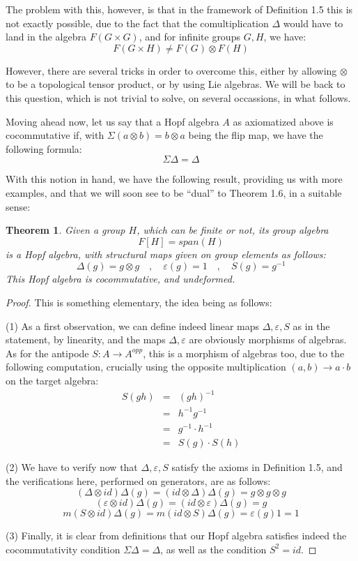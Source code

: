 \documentclass[12pt]{amsbook}
\newtheorem{theorem}{Theorem}[chapter]
\begin{document}
\bigskip

The problem with this, however, is that in the framework of Definition 1.5 this is not exactly possible, due to the fact that the comultiplication $\Delta$ would have to land in the algebra $F(G\times G)$, and for infinite groups $G,H$, we have:
$$F(G\times H)\neq F(G)\otimes F(H)$$

However, there are several tricks in order to overcome this, either by allowing $\otimes$ to be a topological tensor product, or by using Lie algebras. We will be back to this question, which is not trivial to solve, on several occassions, in what follows.

\bigskip

Moving ahead now, let us say that a Hopf algebra $A$ as axiomatized above is cocommutative if, with $\Sigma(a\otimes b)=b\otimes a$ being the flip map, we have the following formula:
$$\Sigma\Delta=\Delta$$

With this notion in hand, we have the following result, providing us with more examples, and that we will soon see to be ``dual'' to Theorem 1.6, in a suitable sense:


\begin{theorem}
Given a group $H$, which can be finite or not, its group algebra
$$F[H]=span(H)$$
is a Hopf algebra, with structural maps given on group elements as follows:
$$\Delta(g)=g\otimes g\quad,\quad
\varepsilon(g)=1\quad,\quad
S(g)=g^{-1}$$
This Hopf algebra is cocommutative, and undeformed.
\end{theorem}

\begin{proof}
This is something elementary, the idea being as follows:

\medskip

(1) As a first observation, we can define indeed linear maps $\Delta,\varepsilon,S$ as in the statement, by linearity, and the maps $\Delta,\varepsilon$ are obviously morphisms of algebras. As for the antipode $S:A\to A^{opp}$, this is a morphism of algebras too, due to the following computation, crucially using the opposite multiplication $(a,b)\to a\cdot b$ on the target algebra:
\begin{eqnarray*}
S(gh)
&=&(gh)^{-1}\\
&=&h^{-1}g^{-1}\\
&=&g^{-1}\cdot h^{-1}\\
&=&S(g)\cdot S(h)
\end{eqnarray*}

(2) We have to verify now that $\Delta,\varepsilon,S$ satisfy the axioms in Definition 1.5, and the verifications here, performed on generators, are as follows:
$$(\Delta\otimes id)\Delta(g)=(id\otimes \Delta)\Delta(g)=g\otimes g\otimes g$$
$$(\varepsilon\otimes id)\Delta(g)=(id\otimes\varepsilon)\Delta(g)=g$$
$$m(S\otimes id)\Delta(g)=m(id\otimes S)\Delta(g)=\varepsilon(g)1=1$$

(3) Finally, it is clear from definitions that our Hopf algebra satisfies indeed the cocommutativity condition $\Sigma\Delta=\Delta$, as well as the condition $S^2=id$.
\end{proof}
\end{document}
